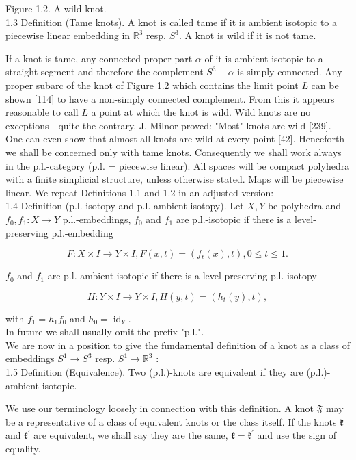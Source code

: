\documentclass[10pt, letterpaper]{article}
\begin{document}
Figure 1.2. A wild knot.\\
1.3 Definition (Tame knots). A knot is called tame if it is ambient isotopic to a piecewise linear embedding in $\mathbb{R}^{3}$ resp. $S^{3}$. A knot is wild if it is not tame.

If a knot is tame, any connected proper part $\alpha$ of it is ambient isotopic to a straight segment and therefore the complement $S^{3}-\alpha$ is simply connected. Any proper subarc of the knot of Figure 1.2 which contains the limit point $L$ can be shown [114] to have a non-simply connected complement. From this it appears reasonable to call $L$ a point at which the knot is wild. Wild knots are no exceptions - quite the contrary. J. Milnor proved: "Most" knots are wild [239]. One can even show that almost all knots are wild at every point [42]. Henceforth we shall be concerned only with tame knots. Consequently we shall work always in the p.l.-category (p.l. = piecewise linear). All spaces will be compact polyhedra with a finite simplicial structure, unless otherwise stated. Maps will be piecewise linear. We repeat Definitions 1.1 and 1.2 in an adjusted version:\\
1.4 Definition (p.l.-isotopy and p.l.-ambient isotopy). Let $X, Y$ be polyhedra and $f_{0}, f_{1}: X \rightarrow Y$ p.l.-embeddings, $f_{0}$ and $f_{1}$ are p.l.-isotopic if there is a level-preserving p.l.-embedding

$$
F: X \times I \rightarrow Y \times I, F(x, t)=\left(f_{t}(x), t\right), 0 \leq t \leq 1 .
$$

$f_{0}$ and $f_{1}$ are p.l.-ambient isotopic if there is a level-preserving p.l.-isotopy

$$
H: Y \times I \rightarrow Y \times I, H(y, t)=\left(h_{t}(y), t\right),
$$

with $f_{1}=h_{1} f_{0}$ and $h_{0}=\operatorname{id}_{Y}$.\\
In future we shall usually omit the prefix "p.l.".\\
We are now in a position to give the fundamental definition of a knot as a class of embeddings $S^{1} \rightarrow S^{3}$ resp. $S^{1} \rightarrow \mathbb{R}^{3}$ :\\
1.5 Definition (Equivalence). Two (p.l.)-knots are equivalent if they are (p.l.)-ambient isotopic.

We use our terminology loosely in connection with this definition. A knot $\mathfrak{F}$ may be a representative of a class of equivalent knots or the class itself. If the knots $\mathfrak{k}$ and $\mathfrak{k}^{\prime}$ are equivalent, we shall say they are the same, $\mathfrak{k}=\mathfrak{k}^{\prime}$ and use the sign of equality.
\end{document}
